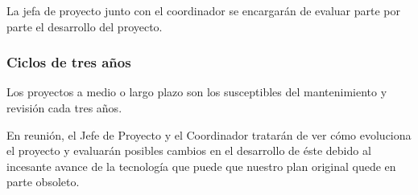 \documentclass[11pt,a4paper,spanish,twoside]{book}
\begin{document}
La jefa de proyecto junto con el coordinador se encargarán de evaluar parte por
parte el desarrollo del proyecto.

\subsubsection{Ciclos de tres años}
Los proyectos a medio o largo plazo son los susceptibles del mantenimiento y 
revisión cada tres años.

En reunión, el Jefe de Proyecto y el Coordinador tratarán de ver cómo 
evoluciona el proyecto y evaluarán posibles cambios en el desarrollo de éste 
debido al incesante avance de la tecnología que puede que nuestro plan original
quede en parte obsoleto.

 

\end{document}
